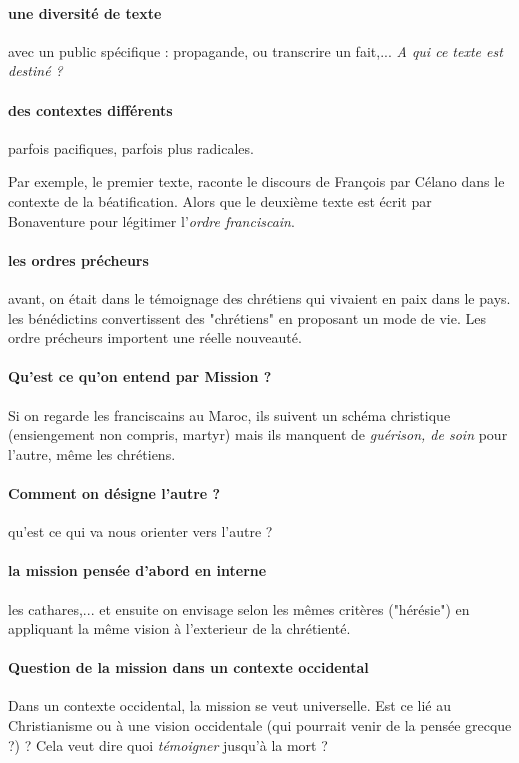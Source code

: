 \paragraph{une diversité de texte} avec un public spécifique : propagande, ou transcrire un fait,... \textit{A qui ce texte est destiné ?}

\paragraph{des contextes différents} parfois pacifiques, parfois plus radicales. 
\begin{Ex}
Par exemple, le premier texte, raconte le discours de François par Célano dans le contexte de la béatification. Alors que le deuxième texte est écrit par Bonaventure pour légitimer l'\textit{ordre franciscain}.
\end{Ex}

\paragraph{les ordres précheurs} avant, on était dans le témoignage des chrétiens qui vivaient en paix dans le pays. les bénédictins convertissent des "chrétiens"  en proposant un mode de vie. Les ordre précheurs importent une réelle nouveauté.



\paragraph{Qu'est ce qu'on entend par Mission ?} Si on regarde les franciscains au Maroc, ils suivent un schéma christique (ensiengement non compris, martyr) mais ils manquent de \textit{guérison, de soin} pour l'autre, même les chrétiens. 

\paragraph{Comment on désigne l'autre ?} qu'est ce qui va nous orienter vers l'autre ?

\paragraph{la mission pensée d'abord en interne} les cathares,... et ensuite on envisage selon les mêmes critères ("hérésie") en appliquant la même vision à l'exterieur de la chrétienté.

\paragraph{Question de la mission dans un contexte occidental} Dans un contexte occidental, la mission se veut universelle. Est ce lié au Christianisme ou à une vision occidentale (qui pourrait venir de la pensée grecque ?) ?
Cela veut dire quoi \textit{témoigner} jusqu'à la mort ? 

